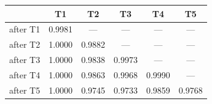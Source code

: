 \begin{tabular}{@{}lccccc@{}}
\toprule
& \textbf{T1} & \textbf{T2} & \textbf{T3} & \textbf{T4} & \textbf{T5} \\
\midrule
after T1 & 0.9981 & --- & --- & --- & --- \\
after T2 & 1.0000 & 0.9882 & --- & --- & --- \\
after T3 & 1.0000 & 0.9838 & 0.9973 & --- & --- \\
after T4 & 1.0000 & 0.9863 & 0.9968 & 0.9990 & --- \\
after T5 & 1.0000 & 0.9745 & 0.9733 & 0.9859 & 0.9768 \\
\bottomrule
\end{tabular}

